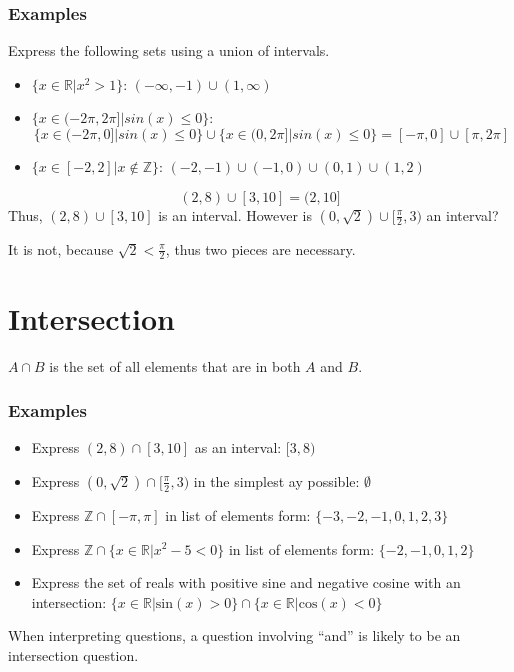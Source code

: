 \documentclass[12pt]{report}
\begin{document}
\begin{flushleft}
\subsubsection*{Examples}
Express the following sets using a union of intervals.
\begin{itemize}
\item \(\{x \in \mathbb{R} | x^2 > 1\}\): \((-\infty, -1) \cup (1, \infty)\)
\item \(\{x \in (-2\pi, 2\pi] | sin(x) \leq 0\}\): 
\[\{x \in (-2\pi, 0] | sin(x) \leq 0\} \cup \{x \in (0, 2\pi] | sin(x) \leq 0\} = [-\pi, 0] \cup [\pi, 2\pi]\]
\item \(\{x \in [-2, 2] | x \notin \mathbb{Z}\}\): \((-2, -1) \cup (-1, 0) \cup (0, 1) \cup (1, 2)\)
\end{itemize}

\[(2, 8) \cup [3, 10] = (2, 10]\]
Thus, \((2, 8) \cup [3, 10]\) is an interval. However is \((0, \sqrt{2}) \cup [\frac{\pi}{2}, 3)\) an interval?
\par
It is not, because \(\sqrt{2} < \frac{\pi}{2}\), thus two pieces are necessary.

\section*{Intersection}
\(A \cap B\) is the set of all elements that are in both \(A\) and \(B\).

\subsubsection*{Examples}
\begin{itemize}
    \item Express \((2, 8) \cap [3, 10]\) as an interval: \([3, 8)\)
    \item Express \((0, \sqrt{2}) \cap [\frac{\pi}{2}, 3)\) in the simplest ay possible: \(\emptyset\)
    \item Express \(\mathbb{Z} \cap [-\pi, \pi]\) in list of elements form: \(\{-3, -2, -1, 0, 1, 2, 3\}\)
    \item Express \(\mathbb{Z} \cap \{x \in \mathbb{R} | x^2 - 5 < 0\}\) in list of elements form: \(\{-2, -1, 0, 1, 2\}\)
    \item Express the set of reals with positive sine and negative cosine with an intersection: \(\{x \in \mathbb{R} | \mathrm{sin}(x) > 0\} \cap \{x \in \mathbb{R} | \mathrm{cos}(x) < 0\}\)
\end{itemize}

When interpreting questions, a question involving ``and'' is likely to be an intersection question.


\end{flushleft}
\end{document}
